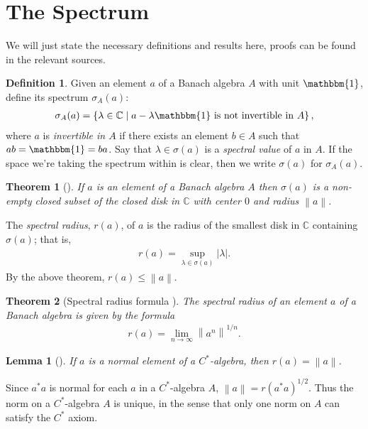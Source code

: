 \documentclass[11pt,a4paper]{report}
\theoremstyle{plain}
\newtheorem*{thm*}{Theorem}
\newtheorem{lemma}{Lemma}
\theoremstyle{definition}
\newtheorem*{defn}{Definition}
\newcommand{\1}{\mathbbm{1}}
\newcommand{\C}{\mathbb{C}}
\newcommand{\spec}[1]{\sigma(#1)}
\begin{document}
\section{The Spectrum}\label{section:spectrum}
We will just state the necessary definitions and results here, proofs can be 
found in the relevant sources.

\begin{defn}
	Given an element $a$ of a Banach algebra $A$ with unit $\1$, define its 
	spectrum $\sigma_A(a)$:
	\begin{align*}
		\sigma_A(a)=\left\{\lambda\in \C \mid a-\lambda\1 
								\mbox{ is not invertible in }A\right\},
	\end{align*}
	where $a$ is \emph{invertible in $A$} if there exists an element $b\in A$ such 
	that $ab=\1=ba$. Say that $\lambda\in\spec a$ is a \emph{spectral value} of $a$ 
	in $A$. If the space we're taking the spectrum within is clear, then we 
	write $\spec{a}$ for $\sigma_A(a)$. 
\end{defn}

\begin{thm*}[{\cite[3.2.3]{kadison83}}]
	If $a$ is an element of a Banach algebra $A$ then $\spec a$ is a non-empty 
	closed subset of the closed disk in $\C$ with center $0$ and radius 
	$\left\|a\right\|$.
\end{thm*}

The \emph{spectral radius}, $r(a)$, of $a$ is the radius of the smallest disk in 
$\C$ containing $\spec a$; that is, 
\begin{align*}
	r(a)=\sup_{\lambda\in\spec a}{|\lambda|}.
\end{align*}
By the above theorem, $r(a)\leq\left\|a\right\|$. 

\begin{thm*}[Spectral radius formula {\cite[3.3.3]{kadison83}}]
	The spectral radius of an element $a$ of a Banach algebra is given by the formula
	\begin{align*}
		r(a)= \lim_{n\to\infty} \left\|a^n\right\|^{1/n}.
	\end{align*}
\end{thm*}

\begin{lemma}[{\cite[4.1.1(i)]{kadison83}}]\label{lemma:411}
	If $a$ is a normal element of a $C^\ast$-algebra, then $r(a)=\left\|a\right\|$.
\end{lemma}

Since $a^\ast a$ is normal for each $a$ in a $C^\ast$-algebra $A$, 
$\left\|a\right\| = r(a^\ast a)^{1/2}$. Thus the norm on a $C^\ast$-algebra $A$ 
is unique, in the sense that only one norm on $A$ can satisfy the $C^\ast$ 
axiom.~\cite[II.1.6.5]{blackadar06} 
\end{document}
